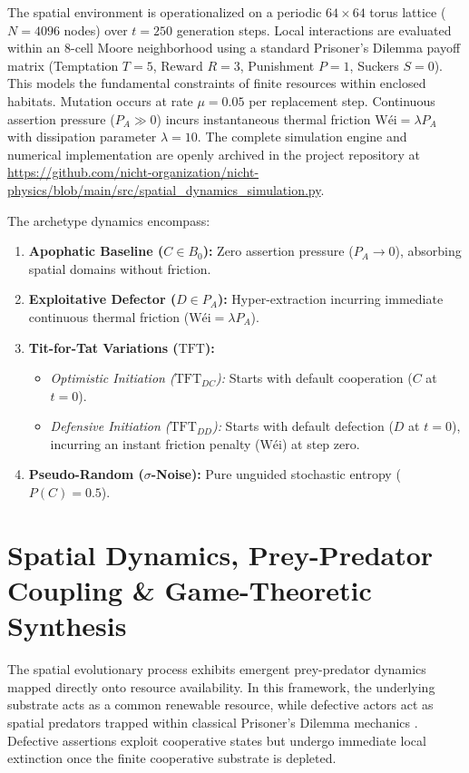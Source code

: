 \documentclass[11pt,a4paper]{article}
\begin{document}
The spatial environment is operationalized on a periodic $64 \times 64$ torus lattice ($N = 4096$ nodes) over $t = 250$ generation steps. Local interactions are evaluated within an 8-cell Moore neighborhood using a standard Prisoner's Dilemma payoff matrix (Temptation $T=5$, Reward $R=3$, Punishment $P=1$, Suckers $S=0$). This models the fundamental constraints of finite resources within enclosed habitats. Mutation occurs at rate $\mu = 0.05$ per replacement step. Continuous assertion pressure ($P_A \gg 0$) incurs instantaneous thermal friction $\text{Wéi} = \lambda P_A$ with dissipation parameter $\lambda = 10$. The complete simulation engine and numerical implementation are openly archived in the project repository at \url{https://github.com/nicht-organization/nicht-physics/blob/main/src/spatial_dynamics_simulation.py}.

\vspace{0.3cm}
The archetype dynamics encompass:
\begin{enumerate}
    \item \textbf{Apophatic Baseline ($C \in B_0$):} Zero assertion pressure ($P_A \to 0$), absorbing spatial domains without friction.
    \item \textbf{Exploitative Defector ($D \in P_A$):} Hyper-extraction incurring immediate continuous thermal friction ($\text{Wéi} = \lambda P_A$).
    \item \textbf{Tit-for-Tat Variations ($\text{TFT}$):}
    \begin{itemize}
        \item \textit{Optimistic Initiation ($\text{TFT}_{DC}$):} Starts with default cooperation ($C$ at $t=0$).
        \item \textit{Defensive Initiation ($\text{TFT}_{DD}$):} Starts with default defection ($D$ at $t=0$), incurring an instant friction penalty ($\text{Wéi}$) at step zero.
    \end{itemize}
    \item \textbf{Pseudo-Random ($\sigma$-Noise):} Pure unguided stochastic entropy ($P(C) = 0.5$).
\end{enumerate}

\section{Spatial Dynamics, Prey-Predator Coupling \& Game-Theoretic Synthesis}
The spatial evolutionary process exhibits emergent prey-predator dynamics mapped directly onto resource availability. In this framework, the underlying substrate acts as a common renewable resource, while defective actors act as spatial predators trapped within classical Prisoner's Dilemma mechanics \cite{nash1950equilibrium}. Defective assertions exploit cooperative states but undergo immediate local extinction once the finite cooperative substrate is depleted.
\end{document}
